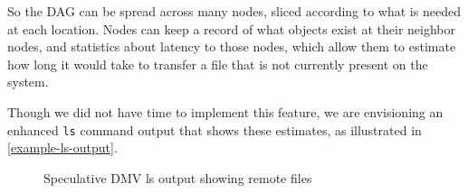 So the DAG can be spread across many nodes, sliced according to what is needed
at each location. Nodes can keep a record of what objects exist at their
neighbor nodes, and statistics about latency to those nodes, which allow them to
estimate how long it would take to transfer a file that is not currently present
on the system.

Though we did not have time to implement this feature, we are envisioning an
enhanced \lstinline{ls} command output that shows these estimates, as
illustrated in \autoref{example-ls-output}.

\begin{figure}[]
    \caption{Speculative DMV ls output showing remote files}
    \label{example-ls-output}
    
\end{figure}
